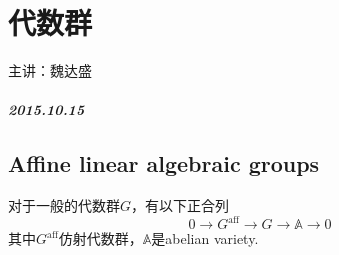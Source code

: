 \newcommand{\Ga}{\mathbf{G}_\mathrm{a}}
\newcommand{\Gm}{\mathbf{G}_\mathrm{m}}


\chapter{代数群}
主讲：魏达盛
\paragraph{2015.10.15}
\section{Affine linear algebraic groups}		
对于一般的代数群$G$，有以下正合列
\[0\longrightarrow G^{\mbox{aff}} \longrightarrow G\longrightarrow \mathbb{A} \longrightarrow 0\]
其中$G^{\mbox{aff}}$仿射代数群，$\mathbb{A}$是abelian variety.

